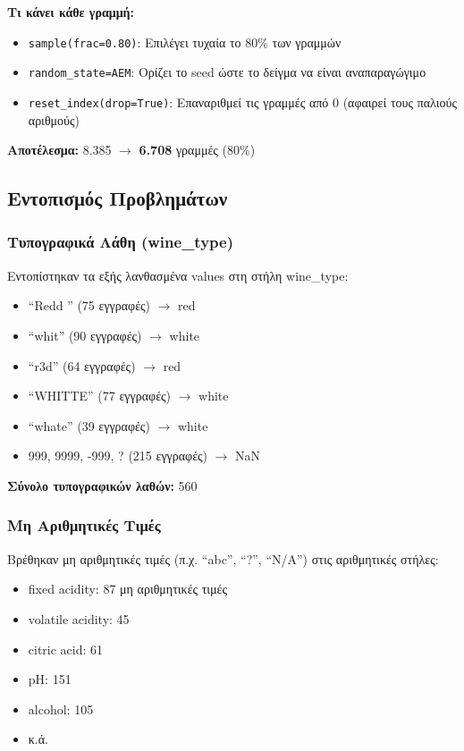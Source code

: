 \documentclass[12pt,a4paper]{article}
\begin{document}
\textbf{Τι κάνει κάθε γραμμή:}
\begin{itemize}
    \item \texttt{sample(frac=0.80)}: Επιλέγει τυχαία το 80\% των γραμμών
    \item \texttt{random\_state=AEM}: Ορίζει το seed ώστε το δείγμα να είναι αναπαραγώγιμο
    \item \texttt{reset\_index(drop=True)}: Επαναριθμεί τις γραμμές από 0 (αφαιρεί τους παλιούς αριθμούς)
\end{itemize}

\textbf{Αποτέλεσμα:} 8.385 $\rightarrow$ \textbf{6.708} γραμμές (80\%)

\subsection{Εντοπισμός Προβλημάτων}

\subsubsection{Τυπογραφικά Λάθη (wine\_type)}

Εντοπίστηκαν τα εξής λανθασμένα values στη στήλη wine\_type:

\begin{itemize}
    \item ``Redd '' (75 εγγραφές) $\rightarrow$ red
    \item ``whit'' (90 εγγραφές) $\rightarrow$ white
    \item ``r3d'' (64 εγγραφές) $\rightarrow$ red
    \item ``WHITTE'' (77 εγγραφές) $\rightarrow$ white
    \item ``whate'' (39 εγγραφές) $\rightarrow$ white
    \item 999, 9999, -999, ? (215 εγγραφές) $\rightarrow$ NaN
\end{itemize}

\textbf{Σύνολο τυπογραφικών λαθών:} 560

\subsubsection{Μη Αριθμητικές Τιμές}

Βρέθηκαν μη αριθμητικές τιμές (π.χ. ``abc'', ``?'', ``N/A'') στις αριθμητικές στήλες:

\begin{itemize}
    \item fixed acidity: 87 μη αριθμητικές τιμές
    \item volatile acidity: 45
    \item citric acid: 61
    \item pH: 151
    \item alcohol: 105
    \item κ.ά.
\end{itemize}
\end{document}
